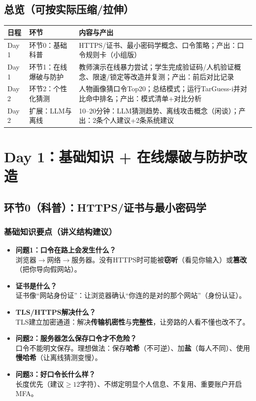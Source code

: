 \documentclass[UTF8,a4paper,12pt]{ctexart}
\begin{document}
\subsection*{总览（可按实际压缩/拉伸）}
\begin{longtable}{@{}p{}p{}p{}@{}}
\toprule
\textbf{日程} & \textbf{环节} & \textbf{内容与产出} \\
\midrule
\endhead
Day 1 & 环节0：基础科普 & HTTPS/证书、最小密码学概念、口令策略；产出：口令规则卡（小组版）\\
Day 1 & 环节1：在线爆破与防护 & 教师演示在线暴力尝试；学生完成验证码/人机验证概念、限速/锁定等改造并复测；产出：前后对比记录 \\
Day 2 & 环节2：个性化猜测 & 人物画像猜口令Top20；总结模式；运行TarGuess-i并对比命中排名；产出：模式清单+对比分析 \\
Day 2 & 扩展：LLM与离线 & 10--20分钟：LLM猜测趋势、离线攻击概念（闲谈）；产出：2条个人建议+2条系统建议 \\
\bottomrule
\end{longtable}

\section{Day 1：基础知识 + 在线爆破与防护改造}

\subsection{环节0（科普）：HTTPS/证书与最小密码学}
\subsubsection*{基础知识要点（讲义结构建议）}
\begin{itemize}
  \item \textbf{问题1：口令在路上会发生什么？}\\
  浏览器$\rightarrow$网络$\rightarrow$服务器。没有HTTPS时可能被\textbf{窃听}（看见你输入）或\textbf{篡改}（把你导向假网站）。
  \item \textbf{证书是什么？}\\
  证书像``网站身份证''：让浏览器确认``你连的是对的那个网站''（身份认证）。
  \item \textbf{TLS/HTTPS解决什么？}\\
  TLS建立加密通道：解决\textbf{传输机密性}与\textbf{完整性}，让旁路的人看不懂也改不了。
  \item \textbf{问题2：服务器怎么保存口令才不危险？}\\
  口令不能明文保存。理想做法：保存\textbf{哈希}（不可逆）、加\textbf{盐}（每人不同）、使用\textbf{慢哈希}（让离线猜测变慢）。
  \item \textbf{问题3：好口令长什么样？}\\
  长度优先（建议$\ge 12$字符）、不绑定明显个人信息、不复用、重要账户开启MFA。
\end{itemize}
\end{document}
